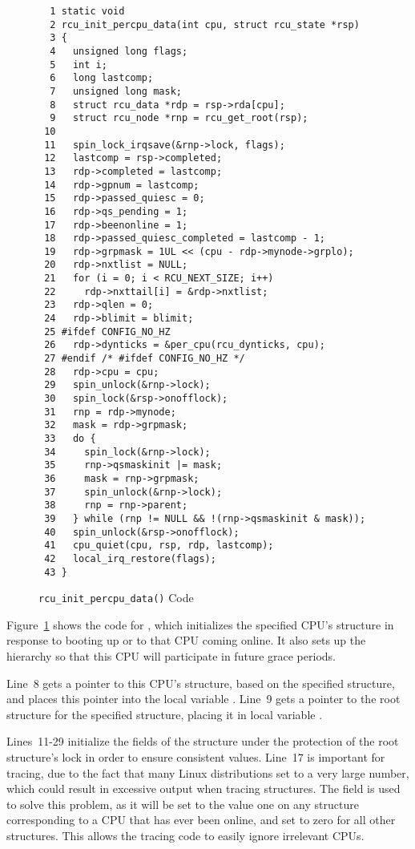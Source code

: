 \begin{figure}[tbp]
{ \scriptsize
\begin{verbatim}
  1 static void
  2 rcu_init_percpu_data(int cpu, struct rcu_state *rsp)
  3 {
  4   unsigned long flags;
  5   int i;
  6   long lastcomp;
  7   unsigned long mask;
  8   struct rcu_data *rdp = rsp->rda[cpu];
  9   struct rcu_node *rnp = rcu_get_root(rsp);
 10
 11   spin_lock_irqsave(&rnp->lock, flags);
 12   lastcomp = rsp->completed;
 13   rdp->completed = lastcomp;
 14   rdp->gpnum = lastcomp;
 15   rdp->passed_quiesc = 0;
 16   rdp->qs_pending = 1;
 17   rdp->beenonline = 1;
 18   rdp->passed_quiesc_completed = lastcomp - 1;
 19   rdp->grpmask = 1UL << (cpu - rdp->mynode->grplo);
 20   rdp->nxtlist = NULL;
 21   for (i = 0; i < RCU_NEXT_SIZE; i++)
 22     rdp->nxttail[i] = &rdp->nxtlist;
 23   rdp->qlen = 0;
 24   rdp->blimit = blimit;
 25 #ifdef CONFIG_NO_HZ
 26   rdp->dynticks = &per_cpu(rcu_dynticks, cpu);
 27 #endif /* #ifdef CONFIG_NO_HZ */
 28   rdp->cpu = cpu;
 29   spin_unlock(&rnp->lock);
 30   spin_lock(&rsp->onofflock);
 31   rnp = rdp->mynode;
 32   mask = rdp->grpmask;
 33   do {
 34     spin_lock(&rnp->lock);
 35     rnp->qsmaskinit |= mask;
 36     mask = rnp->grpmask;
 37     spin_unlock(&rnp->lock);
 38     rnp = rnp->parent;
 39   } while (rnp != NULL && !(rnp->qsmaskinit & mask));
 40   spin_unlock(&rsp->onofflock);
 41   cpu_quiet(cpu, rsp, rdp, lastcomp);
 42   local_irq_restore(flags);
 43 }
\end{verbatim}
}
\caption{{\tt rcu\_init\_percpu\_data()} Code}
\label{fig:app:rcuimpl:rcutreewt:Code for rcu-init-percpu-data}
\end{figure}

Figure~\ref{fig:app:rcuimpl:rcutreewt:Code for rcu-init-percpu-data}
shows the code for , which initializes
the specified CPU's  structure in response to booting
up or to that CPU coming online.
It also sets up the  hierarchy so that this CPU will
participate in future grace periods.

Line~8 gets a pointer to this CPU's  structure, based
on the specified  structure, and places this pointer
into the local variable .
Line~9 gets a pointer to the root  structure for the
specified  structure, placing it in local variable
.

Lines~11-29 initialize the fields of the  structure
under the protection of the root  structure's lock
in order to ensure consistent values.
Line~17 is important for tracing, due to the fact that many Linux
distributions set  to a very large number, which could
result in excessive output when tracing  structures.
The  field is used to solve this problem, as
it will be set to the value one on any  structure
corresponding to a CPU that has ever been online, and set to zero
for all other  structures.
This allows the tracing code to easily ignore irrelevant CPUs.

